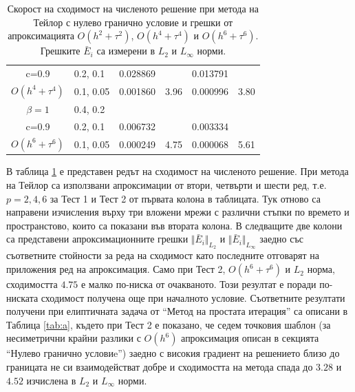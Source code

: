 \documentclass[a4paper]{article}
\theoremstyle{remark}
\begin{document}
\begin{table}[ht]
\begin{tabular}{||c|l|ll|ll||}
       c=0.9                 &0.2, 0.1     & 0.028869   &        &  0.013791   &   \\
 $O(h^4+ \tau^4)$ 	&0.1, 0.05   	&0.001860 	& 3.96  & 0.000996  & 3.80  \\
\hline
  $\beta=1$     		&0.4, 0.2   	&            	&          	&                  &      \\
      c=0.9                  &0.2, 0.1   	&0.006732 	&            & 0.003334      &       \\
 $O(h^6+ \tau^6)$ 	&0.1, 0.05 	& 0.000249 	& 4.75 	& 0.000068  & 5.61        \\
\hline
\hline 
		\end{tabular}
		\caption{Скорост на сходимост на численото решение при метода на Тейлор с нулево гранично условие и грешки от апроксимацията $O(h^{2} + \tau^2 )$, $O(h^{4} + \tau^4 )$ и $O(h^{6} + \tau^6 )$. Грешките $\bar E_i$ са измерени в $L_2$ и $L_\infty$ норми.}
\label{tableA}
\end{table}
В таблица \ref{tableA} е представен редът на сходимост на численото решение. При метода на Тейлор са използвани апроксимации от втори, четвърти и шести ред, т.е. $p=2,4,6$ за Тест 1 и Тест 2 от първата колона в таблицата. Тук отново са направени изчисления върху три вложени мрежи с различни стъпки по времето и пространстово, които са показани във втората колона. В следващите две колони са представени апроксимационните грешки $\Vert \bar E_i \Vert_{L_2} $ и $\Vert \bar E_i \Vert_{L_\infty}$ заедно със съответните стойности за реда на сходимост като последните отговарят на приложения ред на апроксимация. Само при Тест 2, $O(h^6 + \tau^6)$ и $L_2$ норма, сходимостта $4.75$ е малко по-ниска от очакваното. Този резултат е поради по-ниската сходимост получена още при началното условие. Съответните резултати получени при елиптичната задача от ``Метод на простата итерация'' са описани в Таблица \ref{tab:a}, където при Тест 2 е показано, че седем точковия шаблон (за несиметрични крайни разлики с $O(h^6)$ апроксимация описан в секцията ``Нулево гранично условиe'') заедно с високия градиент на решението близо до границата не си взаимодействат добре и сходимостта на метода спада до $3.28$ и $4.52$ изчислена в $L_2$ и $L_\infty$ норми. 
\end{document}
